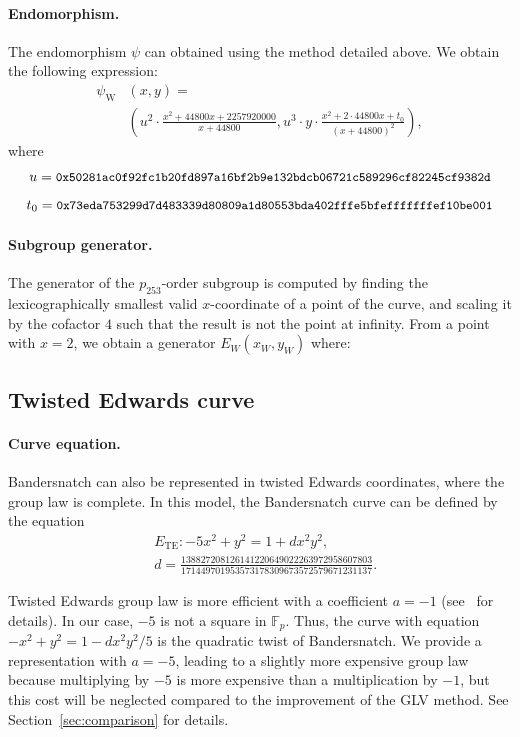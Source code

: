 \documentclass[smallextended]{svjour3}
\newcommand{\Fp}{\ensuremath{\mathbb F_p}}
\begin{document}
\paragraph{Endomorphism.}
The endomorphism $\psi$ can obtained using the method detailed above.
We obtain the following expression:
\begin{align*}
  \psi_\text{W}&(x,y) = \\
  &\left(u^2\cdot \frac{x^2+44800x+2257920000}{x+44800}, u^3\cdot
y\cdot \frac{x^2+2\cdot 44800x+t_0}{(x+44800)^2}\right),
\end{align*}
where
$$u = \text{{\small{\tt 0x50281ac0f92fc1b20fd897a16bf2b9e132bdcb06721c589296cf82245cf9382d}}}$$
$$t_0 = \text{{\small{\tt 0x73eda753299d7d483339d80809a1d80553bda402fffe5bfefffffffef10be001}}}$$

\paragraph{Subgroup generator.}
The generator of the $p_{253}$-order subgroup is computed by finding the
lexicographically smallest valid $x$-coordinate of a point of the
curve, and scaling it by the cofactor $4$ such that the result is not
the point at infinity. From a point with $x=2$, we obtain a generator $E_W(x_W,y_W)$ where:


\subsection{Twisted Edwards curve}
\paragraph{Curve equation.}
Bandersnatch can also be represented in twisted Edwards coordinates,
where the group law is complete.
In this model, the Bandersnatch curve can be defined by the equation
\begin{align*}
&E_\text{TE}:-5x^2+y^2 = 1 + dx^2y^2, \\
&d=\frac{138827208126141220649022263972958607803}{171449701953573178309673572579671231137}.
\end{align*}

Twisted Edwards group law is more efficient with a coefficient
$a = -1$ (see~\cite{AC:HWCD08} for details).
In our case, $-5$ is not a square in $\Fp$. Thus, the curve with
equation $-x^2+y^2 = 1 -dx^2y^2/5$ is the quadratic twist of
Bandersnatch. We provide a representation with $a=-5$, leading to a
slightly more expensive group law because multiplying by $-5$ is more
expensive than a multiplication by $-1$, but this cost will be
neglected compared to the improvement of the GLV method. See
Section~\ref{sec:comparison} for details.
\end{document}
